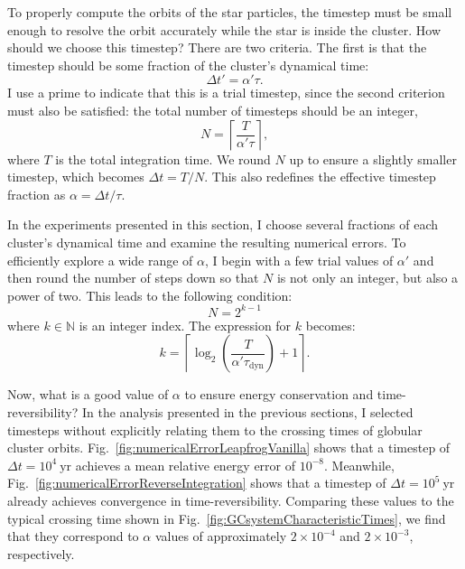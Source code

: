         To properly compute the orbits of the star particles, the timestep must be small enough to resolve the orbit accurately while the star is inside the cluster. How should we choose this timestep? There are two criteria. The first is that the timestep should be some fraction of the cluster's dynamical time:
        \begin{equation}
            \Delta t' = \alpha ' \tau.
        \end{equation}
        I use a prime to indicate that this is a trial timestep, since the second criterion must also be satisfied: the total number of timesteps should be an integer, 
        \[
            N = \left\lceil \frac{T}{\alpha' \tau} \right\rceil,
        \]
        where $T$ is the total integration time. We round $N$ up to ensure a slightly smaller timestep, which becomes $\Delta t = T/N$. This also redefines the effective timestep fraction as $\alpha = \Delta t / \tau$.

        In the experiments presented in this section, I choose several fractions of each cluster's dynamical time and examine the resulting numerical errors. To efficiently explore a wide range of $\alpha$, I begin with a few trial values of $\alpha'$ and then round the number of steps down so that $N$ is not only an integer, but also a power of two. This leads to the following condition:
        \begin{equation}
            N = 2^{k-1}
        \end{equation}
        where $k \in \mathbb{N}$ is an integer index. The expression for $k$ becomes:
        \begin{equation} 
            k = \left\lceil \log_2\left(\frac{T}{\alpha '  \tau_\mathrm{dyn}}\right) + 1  \right\rceil.
            \label{eq:binary_time_step_criterion}
        \end{equation}
        
        Now, what is a good value of $\alpha$ to ensure energy conservation and time-reversibility? In the analysis presented in the previous sections, I selected timesteps without explicitly relating them to the crossing times of globular cluster orbits. Fig.~\ref{fig:numericalErrorLeapfrogVanilla} shows that a timestep of $\Delta t = 10^4~\mathrm{yr}$ achieves a mean relative energy error of $10^{-8}$. Meanwhile, Fig.~\ref{fig:numericalErrorReverseIntegration} shows that a timestep of $\Delta t = 10^5~\mathrm{yr}$ already achieves convergence in time-reversibility. Comparing these values to the typical crossing time shown in Fig.~\ref{fig:GCsystemCharacteristicTimes}, we find that they correspond to $\alpha$ values of approximately $2 \times 10^{-4}$ and $2 \times 10^{-3}$, respectively.

